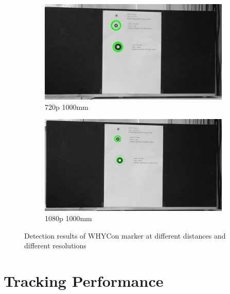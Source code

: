 \begin{figure}
    \begin{subfigure}[b]{.45\linewidth}
        \includegraphics[width=\linewidth]{bilder/project/720p1000mm.png}
        \caption{720p 1000mm}\label{fig:720p1000mm}
    \end{subfigure}
    \begin{subfigure}[b]{.45\linewidth}
        \includegraphics[width=\linewidth]{bilder/project/1080p1000mm.png}
        \caption{1080p 1000mm}\label{fig:1080p1000mm}
    \end{subfigure}
    \caption{Detection results of WHYCon marker at different distances and different resolutions}
    \label{fig:detection_results}
\end{figure}


\section{Tracking Performance}